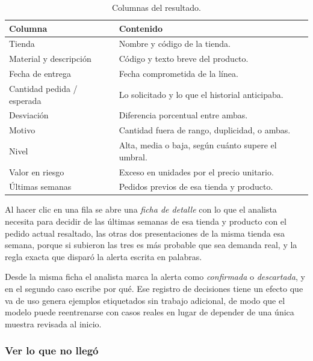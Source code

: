 \begin{table}[htbp]
\centering
\caption{Columnas del resultado.}
\label{tab:columnas-salida}
\small
\begin{tabularx}{\textwidth}{@{}L{4cm}Y@{}}
\toprule
\textbf{Columna} & \textbf{Contenido} \\
\midrule
Tienda & Nombre y código de la tienda. \\
Material y descripción & Código y texto breve del producto. \\
Fecha de entrega & Fecha comprometida de la línea. \\
Cantidad pedida / esperada & Lo solicitado y lo que el historial anticipaba. \\
Desviación & Diferencia porcentual entre ambas. \\
Motivo & Cantidad fuera de rango, duplicidad, o ambas. \\
Nivel & Alta, media o baja, según cuánto supere el umbral. \\
Valor en riesgo & Exceso en unidades por el precio unitario. \\
Últimas semanas & Pedidos previos de esa tienda y producto. \\
\bottomrule
\end{tabularx}
\end{table}

Al hacer clic en una fila se abre una \emph{ficha de detalle} con lo que el analista necesita para decidir  de las últimas semanas de esa tienda y producto con el pedido actual resaltado, las otras dos presentaciones de la misma tienda esa semana, porque si subieron las tres es más probable que sea demanda real, y la regla exacta que disparó la alerta escrita en palabras.

Desde la misma ficha el analista marca la alerta como \emph{confirmada} o \emph{descartada}, y en el segundo caso escribe por qué. Ese registro de decisiones tiene un efecto que va  de uso genera ejemplos etiquetados sin trabajo adicional, de modo que el modelo puede reentrenarse con casos reales en lugar de depender de una única muestra revisada al inicio. 

\iffinal\else
\subsubsection{Ver lo que no llegó}

